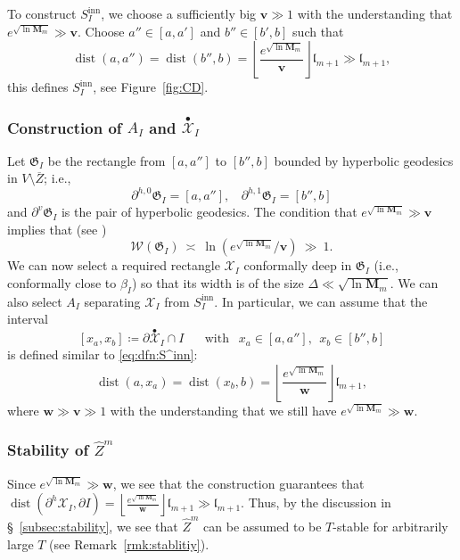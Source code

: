 \documentclass[11pt, reqno]{amsart}
\numberwithin{equation}{section}
\theoremstyle{plain}
\theoremstyle{theorem}
\theoremstyle{plain}
\theoremstyle{definition}
\DeclareMathOperator{\dist}{dist}
\numberwithin{figure}{section}
\newcommand{\upbullet}[1]{\overset{\bullet}{ #1}{}}
\renewcommand{\sp}{{\ \ }}
\newcommand{\Width}{{\mathcal W}}
\newcommand\XX{\mathcal{X}}
\newcommand{\bM}{{\mathbf M}}
\newcommand{\bbv}{{\mathbf v}}
\newcommand{\wZ}{{\widehat Z}}
\newcommand{\bbw}{{\mathbf w}}
\newcommand{\length}{{\mathfrak l}}
\newcommand\inn{{\operatorname{inn}}}
\begin{document}
To construct $S^\inn _I$, we choose a sufficiently big $\bbv\gg 1$ with the understanding that $e^{\sqrt{ \ln \bM_{m}}} \gg \bbv$.
Choose $a''\in [a,a']$ and $b''\in [b',b]$ such that
\begin{equation}
\label{eq:dfn:S^inn}
    \dist(a,a'')=\dist(b'',b) =\left\lfloor \frac{e^{\sqrt{ \ln \bM_{m}}}}{ \bbv}\right\rfloor \length_{m+1} \gg \length_{m+1},
\end{equation} 
this defines $S^\inn _I$, see Figure~\ref{fig:CD}.




\subsubsection{Construction of $A_I$ and $\upbullet \XX_I$}
Let $\mathfrak G_I$ be the rectangle from $[a,a'']$ to $[b'', b]$ bounded by hyperbolic geodesics in $V\setminus \overline Z$; i.e., 
\[ \partial^{h,0} \mathfrak G_I =[a,a''],\sp\sp \partial^{h,1} \mathfrak G_I =[b'',b]\]
and $\partial^{v}\mathfrak G_I $ is the pair of hyperbolic geodesics. The condition that $e^{\sqrt{ \ln \bM_{m}}} \gg \bbv$ implies that (see \cite[\S 4]{DL22})\[ \Width (\mathfrak G_I) \ \asymp\  \ln \left(e^{\sqrt{ \ln \bM_{m}}}/\bbv \right) \ \gg \ 1.\]
We can now select a required rectangle $\XX_I$ conformally deep in $\mathfrak G_I$ (i.e., conformally close to $\beta_I$) so that its width is of the size $\Delta \ll  \sqrt{ \ln \bM_{m}}$. We can also select $A_I$ separating $\XX_I$ from $S^\inn_I$. In particular, we can assume that the interval \[[x_a, x_b]\coloneqq \partial \upbullet \XX_I \cap I\sp\sp\sp\text{ with }\sp x_a\in[a,a''], \sp x_b\in [b'', b]\]
is defined similar to \eqref{eq:dfn:S^inn}:
\[     \dist(a, x_a)=\dist(x_b,b) =\left\lfloor \frac{e^{\sqrt{ \ln \bM_{m}}}}{ \bbw}\right\rfloor \length_{m+1}, \]
where $\bbw \gg \bbv\gg 1$ with the understanding that we still have $e^{\sqrt{ \ln \bM_{m}}}\gg \bbw$.




\subsubsection{Stability of ${\wZ^m}$}\label{subsubsect:stabilityConstruction}
Since $e^{\sqrt{ \ln \bM_{m}}}\gg \bbw$, we see that the construction guarantees that $\dist(\partial^h \XX_I, \partial I) = \left\lfloor \frac{e^{\sqrt{ \ln \bM_{m}}}}{ \bbw}\right\rfloor \length_{m+1} \gg \length_{m+1}$.
Thus, by the discussion in \S~\ref{subsec:stability}, we see that ${\wZ^m}$ can be assumed to be $T$-stable for arbitrarily large $T$ (see Remark~\ref{rmk:stablitiy}).
\end{document}
